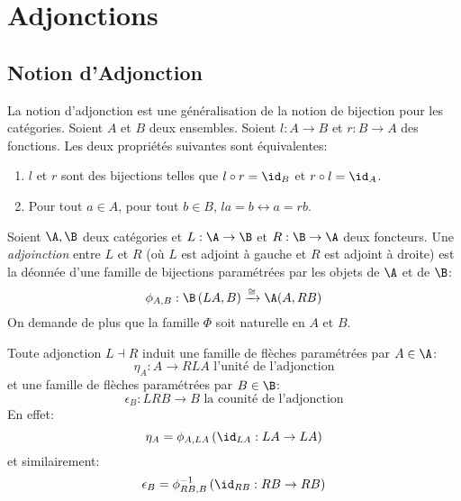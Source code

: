 \documentclass[math, info]{cours}
\begin{document}
\section{Adjonctions}
\subsection{Notion d'Adjonction}
La notion d'adjonction est une généralisation de la notion de bijection pour les catégories.
Soient $A$ et $B$ deux ensembles. Soient $l : A \to B$ et $r: B \to A$ des fonctions.
Les deux propriétés suivantes sont équivalentes:
\begin{enumerate}
	\item $l$ et $r$ sont des bijections telles que $l \circ r = \id_{B}$ et $r \circ l = \id_{A}$.
	\item Pour tout $a \in A$, pour tout $b \in B$, $la = b \leftrightarrow a = rb$.
\end{enumerate}

\begin{definition}
	Soient $\A, \B$ deux catégories et $L : \A \to \B$ et $R: \B \to \A$ deux foncteurs.
	Une \emph{adjoinction} entre $L$ et $R$ (où $L$ est adjoint à gauche et $R$ est adjoint à droite) est la déonnée d'une famille de bijections paramétrées par les objets de $\A$ et de $\B$:
	\begin{equation*}
		\phi_{A, B} : \B\left(LA, B \right)\xrightarrow{\cong} \A(A, RB)
	\end{equation*}
	On demande de plus que la famille $\Phi$ soit naturelle en $A$ et $B$.
	\label{def:adjonction}
\end{definition}

\begin{definition}
	Toute adjonction $L \dashv R$ induit une famille de flèches paramétrées par $A \in \A$:
	\begin{equation*}
		\eta_{A}: A \to RLA \text{ l'unité de l'adjonction}
	\end{equation*}
	et une famille de flèches paramétrées par $B \in \B$:
	\begin{equation*}
		\epsilon_{B} : LRB \to B \text{ la counité de l'adjonction}
	\end{equation*}
	En effet:
	\begin{equation*}
		\eta_{A} = \phi_{A, LA}\left(\id_{LA} : LA \to LA \right)
	\end{equation*}
	et similairement:
	\begin{equation*}
		\epsilon_{B} = \phi_{RB, B}^{-1}\left(\id_{RB}: RB \to RB \right)
	\end{equation*}
	\label{def:unitécounité}
\end{definition}
\end{document}
